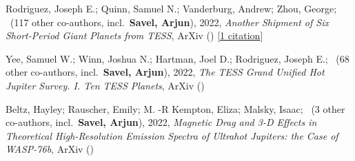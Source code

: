 \item[{\color{numcolor}\scriptsize3}] Rodriguez, Joseph E.; Quinn, Samuel N.; Vanderburg, Andrew; Zhou, George; \etal\ ({117} other co-authors, incl.\ \textbf{Savel, Arjun}), 2022, \emph{Another Shipment of Six Short-Period Giant Planets from TESS}, ArXiv () [\href{https://ui.adsabs.harvard.edu/abs/2022arXiv220505709R}{1 citation}]

\item[{\color{numcolor}\scriptsize2}] Yee, Samuel W.; Winn, Joshua N.; Hartman, Joel D.; Rodriguez, Joseph E.; \etal\ ({68} other co-authors, incl.\ \textbf{Savel, Arjun}), 2022, \emph{The TESS Grand Unified Hot Jupiter Survey. I. Ten TESS Planets}, ArXiv ()

\item[{\color{numcolor}\scriptsize1}] Beltz, Hayley; Rauscher, Emily; M. -R Kempton, Eliza; Malsky, Isaac; \etal\ ({3} other co-authors, incl.\ \textbf{Savel, Arjun}), 2022, \emph{Magnetic Drag and 3-D Effects in Theoretical High-Resolution Emission Spectra of Ultrahot Jupiters: the Case of WASP-76b}, ArXiv ()